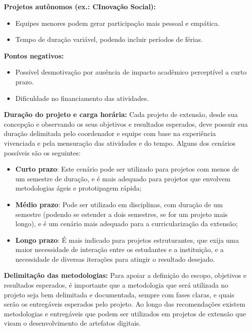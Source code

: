 \textbf{Projetos autônomos (ex.: CInovação Social):}
\begin{itemize}
    \item Equipes menores podem gerar participação mais pessoal e empática.
    \item Tempo de duração variável, podendo incluir períodos de férias.
\end{itemize}

\textbf{Pontos negativos:}
\begin{itemize}
    \item Possível desmotivação por ausência de impacto acadêmico perceptível a curto prazo.
    \item Dificuldade no financiamento das atividades.
\end{itemize}

\textbf{Duração do projeto e carga horária:}
Cada projeto de extensão, desde sua concepção e observando os seus objetivos e resultados esperados, deve possuir sua duração delimitada pelo coordenador e equipe com base na experiência vivenciada e pela mensuração das atividades e do tempo. Alguns dos cenários possíveis são os seguintes:

\begin{itemize}
    \item \textbf{Curto prazo}: Este cenário pode ser utilizado para projetos com menos de um semestre de duração, e é mais adequado para projetos que envolvem metodologias ágeis e prototipagem rápida;
    \item \textbf{Médio prazo}: Pode ser utilizado em disciplinas, com duração de um semestre (podendo se estender a dois semestres, se for um projeto mais longo), e é um cenário mais adequado para a curricularização da extensão;
    \item \textbf{Longo prazo}: É mais indicado para projetos estruturantes, que exija uma maior necessidade de interação entre os estudantes e a instituição, e a necessidade de diversas iterações para atingir o resultado desejado.
\end{itemize}

\textbf{Delimitação das metodologias:}
Para apoiar a definição do escopo, objetivos e resultados esperados, é importante que a metodologia que será utilizada no projeto seja bem delimitada e documentada, sempre com fases claras, e quais serão os entregáveis esperados pelo projeto. Ao longo das recomendações existem metodologias e entregáveis que podem ser utilizados em projetos de extensão que visam o desenvolvimento de artefatos digitais. 



